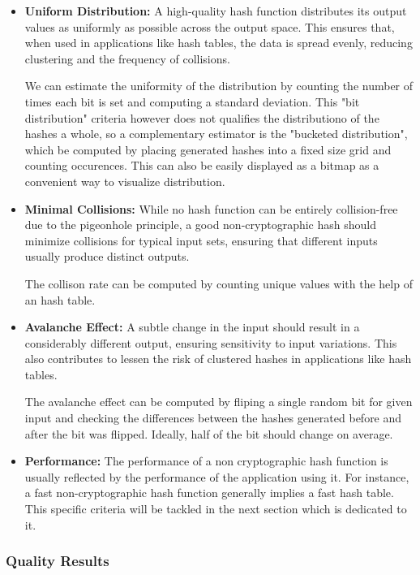\documentclass[10pt]{article}
\begin{document}
\begin{itemize}
    \item \textbf{Uniform Distribution:} A high-quality hash function distributes its output values as uniformly as possible across the output space. This ensures that, when used in applications like hash tables, the data is spread evenly, reducing clustering and the frequency of collisions.

    We can estimate the uniformity of the distribution by counting the number of times each bit is set and computing a standard deviation. This "bit distribution" criteria however does not qualifies the distributiono of the hashes a whole, so a complementary estimator is the "bucketed distribution", which be computed by placing generated hashes into a fixed size grid and counting occurences. This can also be easily displayed as a bitmap as a convenient way to visualize distribution.
    \item \textbf{Minimal Collisions:} While no hash function can be entirely collision-free due to the pigeonhole principle, a good non-cryptographic hash should minimize collisions for typical input sets, ensuring that different inputs usually produce distinct outputs.
    
    The collison rate can be computed by counting unique values with the help of an hash table.
    \item \textbf{Avalanche Effect:} A subtle change in the input should result in a considerably different output, ensuring sensitivity to input variations. This also contributes to lessen the risk of clustered hashes in applications like hash tables.
    
    The avalanche effect can be computed by fliping a single random bit for given input and checking the differences between the hashes generated before and after the bit was flipped. Ideally, half of the bit should change on average.
    \item \textbf{Performance:} The performance of a non cryptographic hash function is usually reflected by the performance of the application using it. For instance, a fast non-cryptographic hash function generally implies a fast hash table. This specific criteria will be tackled in the next section which is dedicated to it. 

\end{itemize}

\subsubsection{Quality Results}
\end{document}
